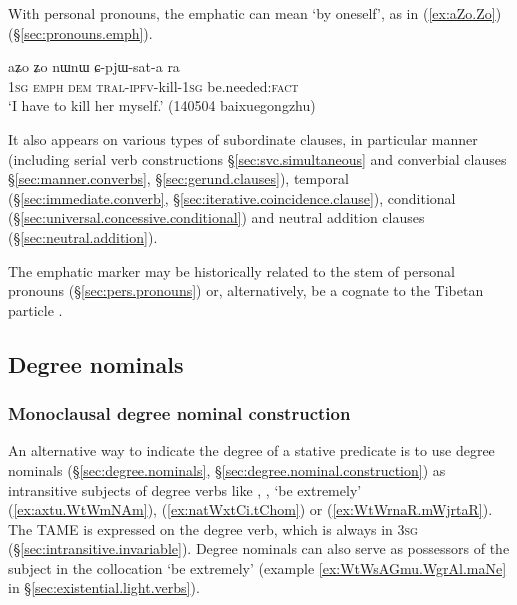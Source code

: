 With personal pronouns, the emphatic  can mean `by oneself', as in (\ref{ex:aZo.Zo}) (§\ref{sec:pronouns.emph}).

\begin{exe}
\ex \label{ex:aZo.Zo}
\gll aʑo ʑo nɯnɯ ɕ-pjɯ-sat-a ra \\
\textsc{1sg} \textsc{emph} \textsc{dem} \textsc{tral}-\textsc{ipfv}-kill-\textsc{1sg} be.needed:\textsc{fact} \\
\glt `I have to kill her myself.' (140504 baixuegongzhu)
\end{exe}

It also appears on various types of subordinate clauses, in particular manner (including serial verb constructions §\ref{sec:svc.simultaneous} and converbial clauses §\ref{sec:manner.converbs}, §\ref{sec:gerund.clauses}), temporal (§\ref{sec:immediate.converb}, §\ref{sec:iterative.coincidence.clause}),  conditional (§\ref{sec:universal.concessive.conditional}) and neutral addition clauses  (§\ref{sec:neutral.addition}).

The emphatic marker may be historically related to the  stem of personal pronouns (§\ref{sec:pers.pronouns}) or, alternatively, be a cognate to the Tibetan particle .

\subsection{Degree nominals} \label{sec:degree.nominal.subject}

\subsubsection{Monoclausal degree nominal construction} \label{sec:degree.monoclausal}
 An alternative way to indicate the degree of a stative predicate is to use degree nominals (§\ref{sec:degree.nominals}, §\ref{sec:degree.nominal.construction}) as intransitive subjects of degree verbs like , , `be extremely' (\ref{ex:axtu.WtWmNAm}),  (\ref{ex:natWxtCi.tChom}) or  (\ref{ex:WtWrnaR.mWjrtaR}). The TAME is expressed on the degree verb, which is always in \textsc{3sg} (§\ref{sec:intransitive.invariable}). Degree nominals can also serve as possessors of the subject   in the collocation  `be extremely' (example \ref{ex:WtWsAGmu.WgrAl.maNe} in §\ref{sec:existential.light.verbs}). 


